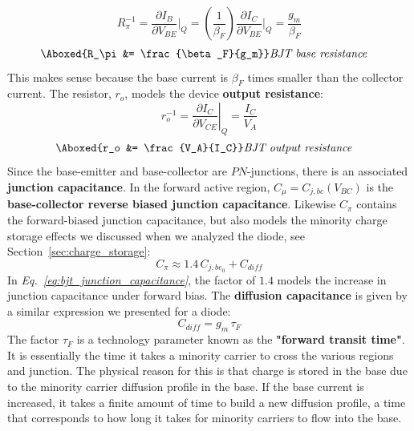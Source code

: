     \begin{equation}
        R_\pi^{-1} = \frac{\partial I_B}{\partial V_{BE}} \bigg\rvert_Q
        = \left( \frac{1}{\beta_F} \right) \frac{\partial I_C}{\partial V_{BE}} \bigg\rvert_Q
        = \frac{g_m}{\beta_F}
    \end{equation}
    \begin{align}
        \Aboxed{R_\pi &= \frac{\beta_F}{g_m}} &\textit{BJT base resistance}
        \label{eq:bjt_base_resistance}
    \end{align}
This makes sense because the base current is $\beta_F$ times smaller than the collector current.  The resistor, $r_o$, models the device \textbf{output resistance}: 
    \begin{equation}
        r_o^{-1} = \left. \frac{\partial I_C}{\partial V_{CE}} \right|_Q  = \frac{I_C}{V_A}
    \end{equation}
    \begin{align}
        \Aboxed{r_o &= \frac{V_A}{I_C}} &\textit{BJT output resistance}
        \label{eq:bjt_output_resistance}
    \end{align}
Since the base-emitter and base-collector are $PN$-junctions, there is an associated \textbf{junction capacitance}.  In the forward active region, $C_{\mu} = C_{j,bc}(V_{BC})$ is the \textbf{base-collector reverse biased junction capacitance}.  Likewise $C_\pi$ contains the forward-biased junction capacitance, but also models the minority charge storage effects we discussed when we analyzed the diode, see Section~\ref{sec:charge_storage}:
    \begin{equation}
        C_\pi \approx 1.4\,C_{j,be_0} + C_{diff}
        \label{eq:bjt_junction_capacitance}
    \end{equation}
In \emph{Eq.~\ref{eq:bjt_junction_capacitance}}, the factor of $1.4$ models the increase in junction capacitance under forward bias.  The \textbf{diffusion capacitance} is given by a similar expression we presented for a diode:
    \begin{equation}
        C_{diff} = g_m\,\tau_F
        \label{eq:bjt_diffusion_capacitance}
    \end{equation}
The factor $\tau_F$ is a technology parameter known as the \textbf{"forward transit time"}.  It is essentially the time it takes a minority carrier to cross the various regions and junction.  The physical reason for this is that charge is stored in the base due to the minority carrier diffusion profile in the base.  If the base current is increased, it takes a finite amount of time to build a new diffusion profile, a time that corresponds to how long it takes for minority carriers to flow into the base.
